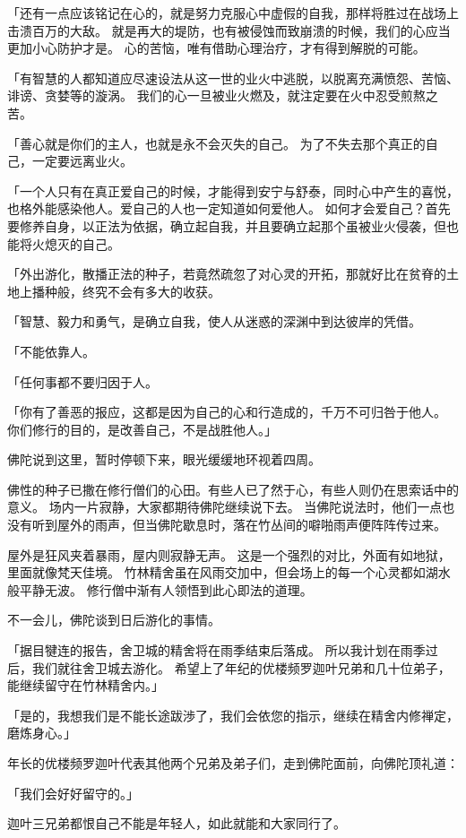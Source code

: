 \documentclass[twoside,openany]{book}
\begin{document}
「还有一点应该铭记在心的，就是努力克服心中虚假的自我，那样将胜过在战场上击溃百万的大敌。
就是再大的堤防，也有被侵蚀而致崩溃的时候，我们的心应当更加小心防护才是。
心的苦恼，唯有借助心理治疗，才有得到解脱的可能。

「有智慧的人都知道应尽速设法从这一世的业火中逃脱，以脱离充满愤怨、苦恼、诽谤、贪婪等的漩涡。
我们的心一旦被业火燃及，就注定要在火中忍受煎熬之苦。

「善心就是你们的主人，也就是永不会灭失的自己。
为了不失去那个真正的自己，一定要远离业火。

「一个人只有在真正爱自己的时候，才能得到安宁与舒泰，同时心中产生的喜悦，也格外能感染他人。爱自己的人也一定知道如何爱他人。
如何才会爱自己？首先要修养自身，以正法为依据，确立起自我，并且要确立起那个虽被业火侵袭，但也能将火熄灭的自己。

「外出游化，散播正法的种子，若竟然疏忽了对心灵的开拓，那就好比在贫脊的土地上播种般，终究不会有多大的收获。

「智慧、毅力和勇气，是确立自我，使人从迷惑的深渊中到达彼岸的凭借。

「不能依靠人。

「任何事都不要归因于人。

「你有了善恶的报应，这都是因为自己的心和行造成的，千万不可归咎于他人。
你们修行的目的，是改善自己，不是战胜他人。」

佛陀说到这里，暂时停顿下来，眼光缓缓地环视着四周。

佛性的种子已撒在修行僧们的心田。有些人已了然于心，有些人则仍在思索话中的意义。
场内一片寂静，大家都期待佛陀继续说下去。
当佛陀说法时，他们一点也没有听到屋外的雨声，但当佛陀歇息时，落在竹丛间的噼啪雨声便阵阵传过来。

屋外是狂风夹着暴雨，屋内则寂静无声。
这是一个强烈的对比，外面有如地狱，里面就像梵天佳境。
竹林精舍虽在风雨交加中，但会场上的每一个心灵都如湖水般平静无波。
修行僧中渐有人领悟到此心即法的道理。

不一会儿，佛陀谈到日后游化的事情。

「据目犍连的报告，舍卫城的精舍将在雨季结束后落成。
所以我计划在雨季过后，我们就往舍卫城去游化。
希望上了年纪的优楼频罗迦叶兄弟和几十位弟子，能继续留守在竹林精舍内。」

「是的，我想我们是不能长途跋渉了，我们会依您的指示，继续在精舍内修禅定，磨炼身心。」

年长的优楼频罗迦叶代表其他两个兄弟及弟子们，走到佛陀面前，向佛陀顶礼道：

「我们会好好留守的。」

迦叶三兄弟都恨自己不能是年轻人，如此就能和大家同行了。
\end{document}
